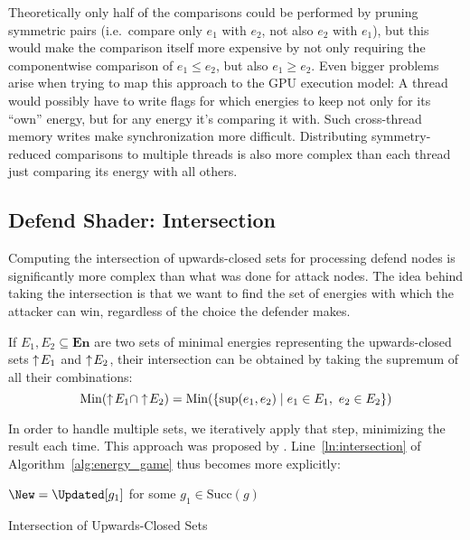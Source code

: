 Theoretically only half of the comparisons could be performed by pruning symmetric
pairs (i.e.\ compare only $e_1$ with $e_2$, not also $e_2$ with $e_1$),
but this would make the comparison itself more expensive by not only requiring
the componentwise comparison of $e_1 \leq e_2$, but also $e_1 \geq e_2$.
Even bigger problems arise when trying to map this approach to the GPU
execution model:
A thread would possibly have to write flags for which energies to keep not only
for its \enquote{own} energy,
but for any energy it's comparing it with.
Such cross-thread memory writes make synchronization more difficult.
Distributing symmetry-reduced comparisons to multiple threads is also
more complex than each thread just comparing its energy with all others.


\subsection{Defend Shader: Intersection}\label{subsec:defend_shader}

Computing the intersection of upwards-closed sets for processing defend nodes
is significantly more complex than what was done for attack nodes.
The idea behind taking the intersection is that we want to find the set of
energies with which the attacker can win,
regardless of the choice the defender makes.

If $E_1, E_2 \subseteq \mathbf{En}$ are two sets of minimal energies
representing the upwards-closed sets $\uparrow\! E_1$ and $\uparrow\! E_2$,
their intersection can be obtained by taking the supremum of all their combinations:
\begin{equation*}
    \mathrm{Min} (\uparrow\! E_1 \cap \uparrow\! E_2 ) =
    \mathrm{Min} (\{ \sup(e_1, e_2) \mid e_1 \in E_1,\ e_2 \in E_2 \})
\end{equation*}

In order to handle multiple sets, we iteratively apply that step,
minimizing the result each time.
This approach was proposed by \textcite{brihaye2023multi}.
Line~\ref{ln:intersection} of Algorithm~\ref{alg:energy_game}
thus becomes more explicitly:

\begin{algorithm}[H]\label{alg:intersection}
    \DontPrintSemicolon

    $\New = \Updated[g_1]$ for some $g_1 \in \mathrm{Succ}(g)$\;

    \caption{Intersection of Upwards-Closed Sets}
\end{algorithm}

